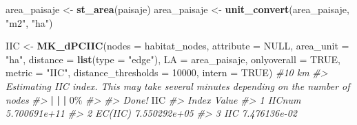 \documentclass[
]{book}
\newenvironment{Shaded}{\begin{snugshade}}{\end{snugshade}}
\newcommand{\AttributeTok}[1]{\textcolor[rgb]{0.13,0.29,0.53}{#1}}
\newcommand{\CommentTok}[1]{\textcolor[rgb]{0.56,0.35,0.01}{\textit{#1}}}
\newcommand{\ConstantTok}[1]{\textcolor[rgb]{0.56,0.35,0.01}{#1}}
\newcommand{\DecValTok}[1]{\textcolor[rgb]{0.00,0.00,0.81}{#1}}
\newcommand{\ErrorTok}[1]{\textcolor[rgb]{0.64,0.00,0.00}{\textbf{#1}}}
\newcommand{\FunctionTok}[1]{\textcolor[rgb]{0.13,0.29,0.53}{\textbf{#1}}}
\newcommand{\NormalTok}[1]{#1}
\newcommand{\OtherTok}[1]{\textcolor[rgb]{0.56,0.35,0.01}{#1}}
\newcommand{\SpecialCharTok}[1]{\textcolor[rgb]{0.81,0.36,0.00}{\textbf{#1}}}
\newcommand{\StringTok}[1]{\textcolor[rgb]{0.31,0.60,0.02}{#1}}
\begin{document}
\begin{Shaded}
\begin{Highlighting}[]
\NormalTok{area\_paisaje }\OtherTok{\textless{}{-}} \FunctionTok{st\_area}\NormalTok{(paisaje) }
\NormalTok{area\_paisaje }\OtherTok{\textless{}{-}} \FunctionTok{unit\_convert}\NormalTok{(area\_paisaje, }\StringTok{"m2"}\NormalTok{, }\StringTok{"ha"}\NormalTok{) }

\NormalTok{IIC }\OtherTok{\textless{}{-}} \FunctionTok{MK\_dPCIIC}\NormalTok{(}\AttributeTok{nodes =}\NormalTok{ habitat\_nodes,}
                \AttributeTok{attribute =} \ConstantTok{NULL}\NormalTok{,}
                \AttributeTok{area\_unit =} \StringTok{"ha"}\NormalTok{,}
                \AttributeTok{distance =} \FunctionTok{list}\NormalTok{(}\AttributeTok{type =} \StringTok{"edge"}\NormalTok{),}
                \AttributeTok{LA =}\NormalTok{ area\_paisaje,}
                \AttributeTok{onlyoverall =} \ConstantTok{TRUE}\NormalTok{,}
                \AttributeTok{metric =} \StringTok{"IIC"}\NormalTok{,}
                \AttributeTok{distance\_thresholds =} \DecValTok{10000}\NormalTok{,}
                \AttributeTok{intern =} \ConstantTok{TRUE}\NormalTok{) }\CommentTok{\#10 km}
\CommentTok{\#\textgreater{} Estimating IIC index. This may take several minutes depending on the number of nodes}
\CommentTok{\#\textgreater{} }
  \SpecialCharTok{|}                                                        
  \ErrorTok{|}                                                  \ErrorTok{|}   \DecValTok{0}\NormalTok{\%}
\CommentTok{\#\textgreater{} }
\CommentTok{\#\textgreater{} Done!}
\NormalTok{IIC}
\CommentTok{\#\textgreater{}     Index        Value}
\CommentTok{\#\textgreater{} 1  IICnum 5.700691e+11}
\CommentTok{\#\textgreater{} 2 EC(IIC) 7.550292e+05}
\CommentTok{\#\textgreater{} 3     IIC 7.476136e{-}02}
\end{Highlighting}
\end{Shaded}
\end{document}
